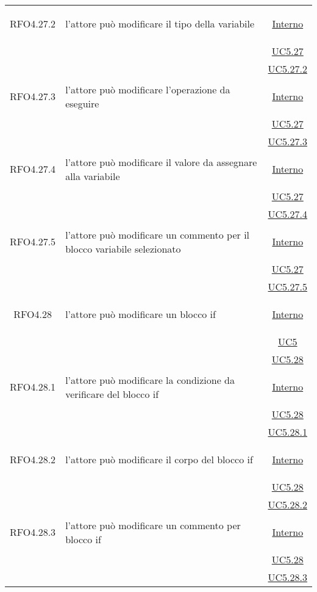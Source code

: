 \begin{longtable}{|c|>{\centering}m{7cm}|c|}
\hypertarget{RFO4.27.2}{RFO4.27.2} & l'attore può modificare il tipo della variabile & \hyperlink{Interno}{Interno}\\
& &\hyperref[UC5.27]{UC5.27}\\
& &\hyperref[UC5.27.2]{UC5.27.2}\\ \hline

\hypertarget{RFO4.27.3}{RFO4.27.3} & l'attore può modificare l'operazione da eseguire & \hyperlink{Interno}{Interno}\\
& &\hyperref[UC5.27]{UC5.27}\\
& &\hyperref[UC5.27.3]{UC5.27.3}\\ \hline

\hypertarget{RFO4.27.4}{RFO4.27.4} & l'attore può modificare il valore da assegnare alla variabile &\hyperlink{Interno}{Interno}\\
& &\hyperref[UC5.27]{UC5.27}\\
& &\hyperref[UC5.27.4]{UC5.27.4}\\ \hline

\hypertarget{RFO4.27.5}{RFO4.27.5} & l'attore può modificare un commento per il blocco variabile selezionato&\hyperlink{Interno}{Interno}\\
& &\hyperref[UC5.27]{UC5.27}\\
& &\hyperref[UC5.27.5]{UC5.27.5}\\ \hline

\hypertarget{RFO4.28}{RFO4.28} & l'attore può modificare un blocco if & \hyperlink{Interno}{Interno}\\
& &\hyperref[UC5]{UC5}\\
& &\hyperref[UC5.28]{UC5.28}\\ \hline

\hypertarget{RFO4.28.1}{RFO4.28.1} & l'attore può modificare la condizione da verificare del blocco if & \hyperlink{Interno}{Interno}\\
& &\hyperref[UC5.28]{UC5.28}\\
& &\hyperref[UC5.28.1]{UC5.28.1}\\ \hline

\hypertarget{RFO4.28.2}{RFO4.28.2} & l'attore può modificare il corpo del blocco if & \hyperlink{Interno}{Interno}\\
& &\hyperref[UC5.28]{UC5.28}\\
& &\hyperref[UC5.28.2]{UC5.28.2}\\ \hline

\hypertarget{RFO4.28.3}{RFO4.28.3} & l'attore può modificare un commento per blocco if & \hyperlink{Interno}{Interno}\\
& &\hyperref[UC5.28]{UC5.28}\\
& &\hyperref[UC5.28.3]{UC5.28.3}\\ \hline


\end{longtable}
